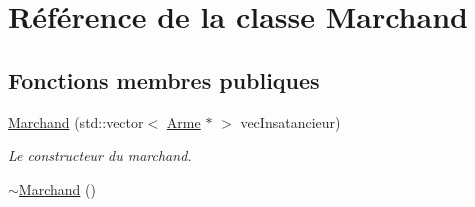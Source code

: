\hypertarget{classMarchand}{\section{Référence de la classe Marchand}
\label{classMarchand}
}
\subsection*{Fonctions membres publiques}
\begin{DoxyCompactItemize}
\item 
\hyperlink{classMarchand_ad4ab208a21ab8adeb741f3f4d1bf3c5c}{Marchand} (std\-::vector$<$ \hyperlink{classArme}{Arme} $\ast$ $>$ vec\-Insatancieur)
\begin{DoxyCompactList}\small\item\em Le constructeur du marchand. \end{DoxyCompactList}\item 
\hypertarget{classMarchand_ab5294b5de6ce2bfff99f2b29d9a2f4ba}{\hyperlink{classMarchand_ab5294b5de6ce2bfff99f2b29d9a2f4ba}{$\sim$\-Marchand} ()}\label{classMarchand_ab5294b5de6ce2bfff99f2b29d9a2f4ba}


\end{DoxyCompactItemize}
